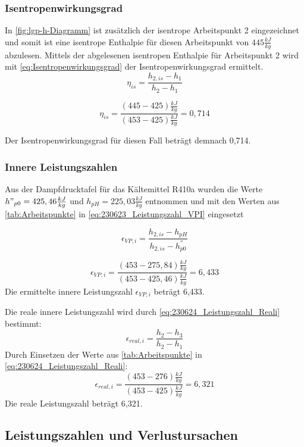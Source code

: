 \subsubsection{Isentropenwirkungsgrad}
 In \autoref{fig:lgp-h-Diagramm} ist zusätzlich der isentrope Arbeitspunkt 2 eingezeichnet und somit ist eine isentrope Enthalpie für diesen Arbeitspunkt von $445 \frac{kJ}{kg}$abzulesen.
Mittels der abgelesenen isentropen Enthalpie für Arbeitspunkt 2 wird mit \autoref{eq:Isentropenwirkungsgrad} der Isentropenwirkungsgrad ermittelt.
\begin{equation}
    \eta_{is}=\frac{h_{2,is}-h_{1}}{h_{2}-h_{1}}
    \label{eq:Isentropenwirkungsgrad}
\end{equation}

$$\eta_{is}=\frac{(445-425)\frac{kJ}{kg}}{(453-425)\frac{kJ}{kg}}=0,714$$

Der Isentropenwirkungsgrad für diesen Fall beträgt demnach 0,714.\\

\subsubsection{Innere Leistungszahlen}

Aus der Dampfdrucktafel für das Kältemittel R410a\cite{DDT-R410A} wurden die Werte $h"_{p0}=425,46 \frac{kJ}{kg}$ und $h_{pH}= 225,03 \frac{kJ}{kg}$ entnommen und mit den Werten aus \autoref{tab:Arbeitspunkte} in \autoref{eq:230623_Leistungszahl_VPI} eingesetzt

\begin{equation}
    \epsilon_{VP,i} = \frac{h_{2,is}-h_{pH}}{h_{2,is}-h^{''}_{p0}}
 \label{eq:230623_Leistungszahl_VPI}
 \end{equation}

 $$\epsilon_{VP,i}= \frac{(453-275,84)\frac{kJ}{kg}}{(453-425,46)\frac{kJ}{kg}} = 6,433 $$
 Die ermittelte innere Leistungszahl $\epsilon_{VP,i}$ beträgt 6,433.

 Die reale innere Leistungszahl wird durch \autoref{eq:230624_Leistungszahl_Reali} bestimmt:
 \begin{equation}
    \epsilon_{real,i}= \frac{h_2-h_3}{h_2-h_1}
    \label{eq:230624_Leistungszahl_Reali}
\end{equation}
Durch Einsetzen der Werte aus \autoref{tab:Arbeitspunkte} in \autoref{eq:230624_Leistungszahl_Reali}:
$$\epsilon_{real,i}= \frac{(453-276)\frac{kJ}{kg}}{(453-425)\frac{kJ}{kg}} = 6,321 $$
Die reale Leistungszahl beträgt 6,321.
\newpage
\subsection{Leistungszahlen und Verlustursachen}


